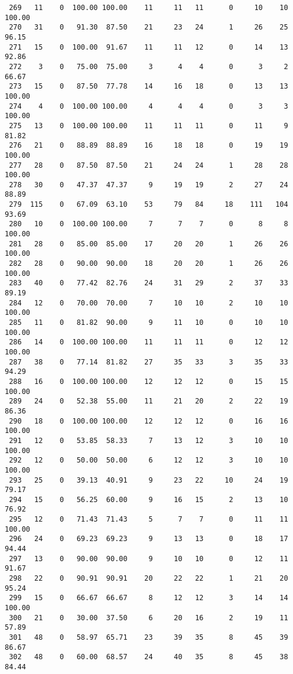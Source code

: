\begin{verbatim}
 269   11    0  100.00 100.00    11     11   11      0     10    10   100.00
 270   31    0   91.30  87.50    21     23   24      1     26    25    96.15
 271   15    0  100.00  91.67    11     11   12      0     14    13    92.86
 272    3    0   75.00  75.00     3      4    4      0      3     2    66.67
 273   15    0   87.50  77.78    14     16   18      0     13    13   100.00
 274    4    0  100.00 100.00     4      4    4      0      3     3   100.00
 275   13    0  100.00 100.00    11     11   11      0     11     9    81.82
 276   21    0   88.89  88.89    16     18   18      0     19    19   100.00
 277   28    0   87.50  87.50    21     24   24      1     28    28   100.00
 278   30    0   47.37  47.37     9     19   19      2     27    24    88.89
 279  115    0   67.09  63.10    53     79   84     18    111   104    93.69
 280   10    0  100.00 100.00     7      7    7      0      8     8   100.00
 281   28    0   85.00  85.00    17     20   20      1     26    26   100.00
 282   28    0   90.00  90.00    18     20   20      1     26    26   100.00
 283   40    0   77.42  82.76    24     31   29      2     37    33    89.19
 284   12    0   70.00  70.00     7     10   10      2     10    10   100.00
 285   11    0   81.82  90.00     9     11   10      0     10    10   100.00
 286   14    0  100.00 100.00    11     11   11      0     12    12   100.00
 287   38    0   77.14  81.82    27     35   33      3     35    33    94.29
 288   16    0  100.00 100.00    12     12   12      0     15    15   100.00
 289   24    0   52.38  55.00    11     21   20      2     22    19    86.36
 290   18    0  100.00 100.00    12     12   12      0     16    16   100.00
 291   12    0   53.85  58.33     7     13   12      3     10    10   100.00
 292   12    0   50.00  50.00     6     12   12      3     10    10   100.00
 293   25    0   39.13  40.91     9     23   22     10     24    19    79.17
 294   15    0   56.25  60.00     9     16   15      2     13    10    76.92
 295   12    0   71.43  71.43     5      7    7      0     11    11   100.00
 296   24    0   69.23  69.23     9     13   13      0     18    17    94.44
 297   13    0   90.00  90.00     9     10   10      0     12    11    91.67
 298   22    0   90.91  90.91    20     22   22      1     21    20    95.24
 299   15    0   66.67  66.67     8     12   12      3     14    14   100.00
 300   21    0   30.00  37.50     6     20   16      2     19    11    57.89
 301   48    0   58.97  65.71    23     39   35      8     45    39    86.67
 302   48    0   60.00  68.57    24     40   35      8     45    38    84.44

\end{verbatim}
